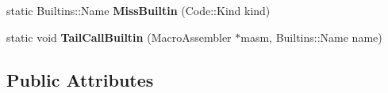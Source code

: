 \begin{DoxyCompactItemize}
\item 
\hypertarget{classv8_1_1internal_1_1_b_a_s_e___e_m_b_e_d_d_e_d_a89dd517af26654033170006d6e56b572}{}static Builtins\+::\+Name {\bfseries Miss\+Builtin} (Code\+::\+Kind kind)\label{classv8_1_1internal_1_1_b_a_s_e___e_m_b_e_d_d_e_d_a89dd517af26654033170006d6e56b572}

\item 
\hypertarget{classv8_1_1internal_1_1_b_a_s_e___e_m_b_e_d_d_e_d_a954ba4854d51fcd4cea99cb85b206027}{}static void {\bfseries Tail\+Call\+Builtin} (Macro\+Assembler $\ast$masm, Builtins\+::\+Name name)\label{classv8_1_1internal_1_1_b_a_s_e___e_m_b_e_d_d_e_d_a954ba4854d51fcd4cea99cb85b206027}

\end{DoxyCompactItemize}
\subsection*{Public Attributes}
